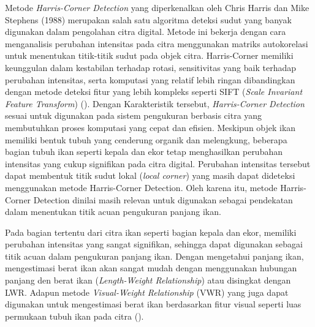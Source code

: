 Metode \emph{Harris-Corner Detection} yang diperkenalkan oleh Chris Harris dan Mike Stephens (1988) merupakan salah satu algoritma deteksi sudut yang banyak digunakan dalam pengolahan citra digital.
Metode ini bekerja dengan cara menganalisis perubahan intensitas pada citra menggunakan matriks autokorelasi untuk menentukan titik-titik sudut pada objek citra.
Harris-Corner memiliki keunggulan dalam kestabilan terhadap rotasi, sensitivitas yang baik terhadap perubahan intensitas, serta komputasi yang relatif lebih ringan dibandingkan dengan metode deteksi fitur yang lebih kompleks seperti SIFT (\emph{Scale Invariant Feature Transform}) (\cite{Lowe2004}). Dengan Karakteristik tersebut, \emph{Harris-Corner Detection} sesuai untuk digunakan pada sistem pengukuran berbasis citra yang membutuhkan proses komputasi yang cepat dan efisien.
Meskipun objek ikan memiliki bentuk tubuh yang cenderung organik dan melengkung, beberapa bagian tubuh ikan seperti kepala dan ekor tetap menghasilkan perubahan intensitas yang cukup signifikan pada citra digital. 
Perubahan intensitas tersebut dapat membentuk titik sudut lokal (\emph{local corner}) yang masih dapat dideteksi menggunakan metode Harris-Corner Detection. Oleh karena itu, metode Harris-Corner Detection dinilai masih relevan untuk digunakan sebagai pendekatan dalam menentukan titik acuan pengukuran panjang ikan.

Pada bagian tertentu dari citra ikan seperti bagian kepala dan ekor, memiliki perubahan intensitas yang sangat signifikan,
sehingga dapat digunakan sebagai titik acuan dalam pengukuran panjang ikan. Dengan mengetahui panjang ikan, mengestimasi berat ikan akan sangat mudah dengan menggunakan hubungan panjang den berat ikan (\emph{Length-Weight Relationship}) atau disingkat dengan LWR\@.
Adapun metode \emph{Visual-Weight Relationship} (VWR) yang juga dapat digunakan untuk mengestimasi berat ikan berdasarkan fitur visual seperti luas permukaan tubuh ikan pada citra (\cite{Gm2023}). 


